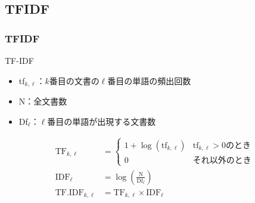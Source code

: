 \documentclass[fleqn,dvipdfmx,10pt]{beamer}
\begin{document}
\subsection{TFIDF}
\begin{frame}\frametitle{TFIDF}
  \begin{block}{TF-IDF}
    \begin{itemize}
    \item tf$_{k,\ell}$：$k$番目の文書の$\ell$番目の単語の頻出回数
    \item N：全文書数
    \item Df$_{\ell}$：$\ell$番目の単語が出現する文書数
    \end{itemize}
    \begin{align*}
      \text{TF}_{k,\ell}
      &= \begin{cases}
        1+\log{(\text{tf}_{k,\ell})}  & \text{tf$_{k,\ell} > 0$のとき} \\
        0 & \text{それ以外のとき}
      \end{cases}\\
      \text{IDF}_{\ell}&=\log{(\frac{\text{N}}{\text{Df}_{\ell}})}\\
      \text{TF.IDF}_{k,\ell}&=\text{TF}_{k,\ell} \times \text{IDF}_{\ell}
    \end{align*}
  \end{block}
\end{frame}
\end{document}
